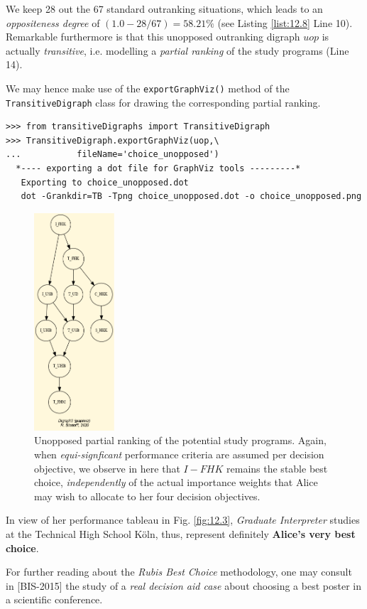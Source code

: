 We keep 28 out the 67 standard outranking situations, which leads to an \emph{oppositeness degree} of $(1.0 - 28/67) = 58.21\%$ (see Listing \ref{list:12.8} Line 10). Remarkable furthermore is that this unopposed outranking digraph $uop$ is actually \emph{transitive}, i.e. modelling a \emph{partial ranking} of the study programs (Line 14).

We may hence make use of the \texttt{exportGraphViz()} method of the\\ \texttt{TransitiveDigraph} class for drawing the corresponding partial ranking.

\begin{lstlisting}
>>> from transitiveDigraphs import TransitiveDigraph
>>> TransitiveDigraph.exportGraphViz(uop,\
...           fileName='choice_unopposed')
  *---- exporting a dot file for GraphViz tools ---------*
   Exporting to choice_unopposed.dot
   dot -Grankdir=TB -Tpng choice_unopposed.dot -o choice_unopposed.png
\end{lstlisting}
\begin{figure}[h]
\sidecaption
\includegraphics[width=3cm]{Figures/AliceChoice_unopposed.png}
\caption{Unopposed partial ranking of the potential study programs. Again, when \emph{equi-signficant} performance criteria are assumed per decision objective, we observe in here that $I-FHK$ remains the stable best choice, \emph{independently} of the actual importance weights that Alice may wish to allocate to her four decision objectives.}
\label{fig:12.7}       %
\end{figure}
\clearpage
In view of her performance tableau in Fig. \ref{fig:12.3}, \emph{Graduate Interpreter} studies at the Technical High School Köln, thus, represent definitely \textbf{Alice's very best choice}.

For further reading about the \emph{Rubis Best Choice} methodology, one may consult in [BIS-2015] the study of a \emph{real decision aid case} about choosing a best poster in a scientific conference.
 
